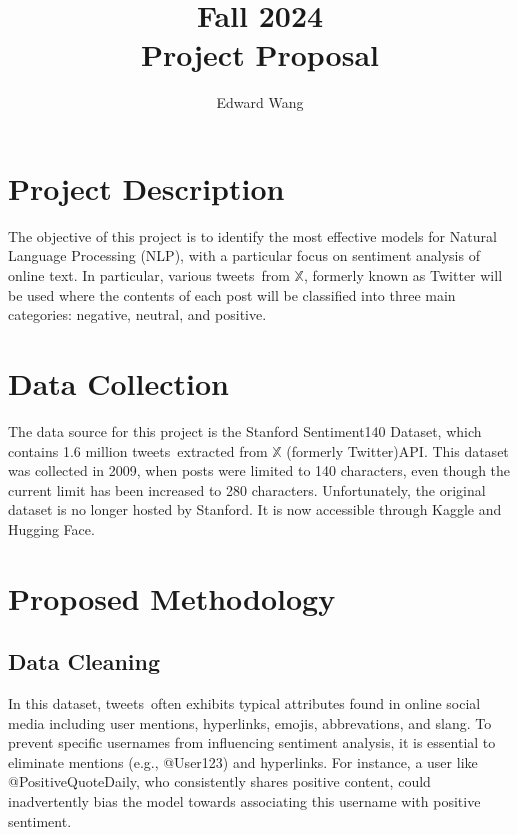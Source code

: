 \documentclass{article}
\title{Fall 2024 \\
Project Proposal}
\author{Edward Wang}
\date{}
\newcommand{\twitter}{$\mathbb{X}$ (formerly Twitter)}
\newcommand{\tweets}{tweets}
\begin{document}
\maketitle


\section{Project Description}

The objective of this project is to identify the most effective models for Natural Language Processing (NLP), with a particular focus on sentiment analysis of online text. In particular, various \tweets\ from $\mathbb{X}$, formerly known as Twitter will be used where the contents of each post will be classified into three main categories: negative, neutral, and positive. 

\section{Data Collection}

The data source for this project is the Stanford Sentiment140 Dataset\cite{go2009twitter}, which contains 1.6 million \tweets\ extracted from \twitter \;API. This dataset was collected in 2009, when posts were limited to 140 characters, even though the current limit has been increased to 280 characters. Unfortunately, the original dataset is no longer hosted by Stanford. It is now accessible through Kaggle\cite{kazanova_sentiment140} and Hugging Face.

\section{Proposed Methodology}

\subsection{Data Cleaning}  

In this dataset, \tweets\ often exhibits typical attributes found in online social media including user mentions, hyperlinks, emojis, abbrevations, and slang. To prevent specific usernames from influencing sentiment analysis, it is essential to eliminate mentions (e.g., @User123) and hyperlinks. For instance, a user like @PositiveQuoteDaily, who consistently shares positive content, could inadvertently bias the model towards associating this username with positive sentiment.  
\end{document}
